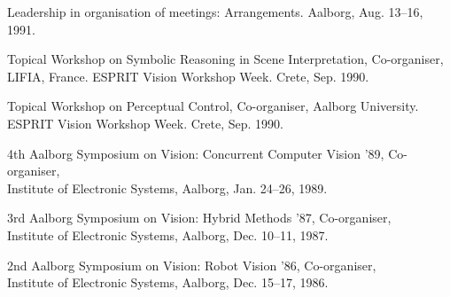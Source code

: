 \documentclass{article}
\begin{document}
\begin{cv}
\begin{cvlist}{Leadership in organisation of meetings:}
  Arrangements. Aalborg, \cftdotfill{\cftdotsep} Aug. 13--16, 1991.
\item Topical Workshop on Symbolic Reasoning in Scene Interpretation,
  Co-organiser, \\LIFIA, France.  ESPRIT Vision Workshop Week. Crete,
  \cftdotfill{\cftdotsep} Sep. 1990.
\item Topical Workshop on Perceptual Control, Co-organiser, Aalborg
  University. \\ ESPRIT Vision Workshop Week.  Crete,
  \cftdotfill{\cftdotsep} Sep. 1990.
\item 4th Aalborg Symposium on Vision: Concurrent Computer Vision '89,
  Co-organiser, \\ Institute of Electronic Systems, Aalborg,
  \cftdotfill{\cftdotsep} Jan. 24--26, 1989.
\item 3rd Aalborg Symposium on Vision: Hybrid Methods '87,
  Co-organiser, \\ Institute of Electronic Systems, Aalborg,
  \cftdotfill{\cftdotsep} Dec. 10--11, 1987.
\item 2nd Aalborg Symposium on Vision: Robot Vision '86, Co-organiser,
  \\ Institute of Electronic Systems, Aalborg, \cftdotfill{\cftdotsep}
  Dec. 15--17, 1986.
\end{cvlist}


\end{cv}
\end{document}
